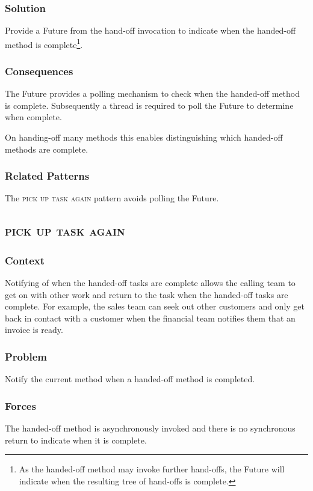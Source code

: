 \documentclass[prodmode]{style/acmlarge}
\begin{document}
\subsubsection*{Solution} Provide a Future from the hand-off invocation to
indicate when the handed-off method is complete\footnote{As the handed-off
method may invoke further hand-offs, the Future will indicate when the resulting
tree of hand-offs is complete.}.

\subsubsection*{Consequences} The Future provides a polling mechanism to check
when the handed-off method is complete.  Subsequently a thread is required to
poll the Future to determine when complete.

On handing-off many methods this enables distinguishing which handed-off methods
are complete.

\subsubsection*{Related Patterns} The \textsc{pick up task again} pattern avoids
polling the Future.



\subsection{\textsc{\textbf{pick up task again}}}

\subsubsection*{Context} Notifying of when the handed-off tasks are complete allows
the calling team to get on with other work and return to the task when the
handed-off tasks are complete.  For example, the sales team can seek out other
customers and only get back in contact with a customer when the financial team
notifies them that an invoice is ready.

\subsubsection*{Problem} Notify the current method when a handed-off method is
completed.

\subsubsection*{Forces} The handed-off method is asynchronously invoked and there is
no synchronous return to indicate when it is complete.
\end{document}
